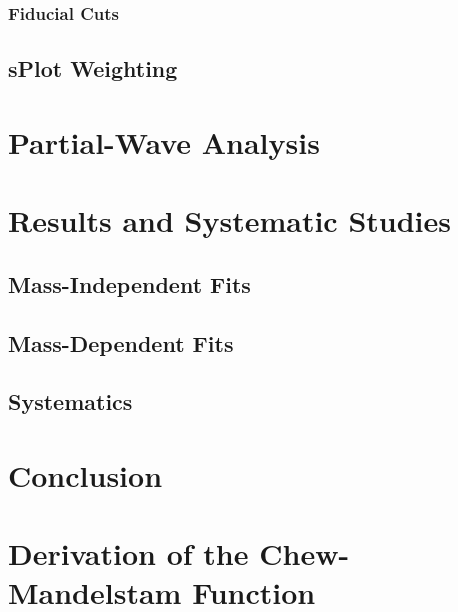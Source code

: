 \documentclass{memoir}
\begin{document}
\subsection{Fiducial Cuts}
\section{sPlot Weighting}

\chapter{Partial-Wave Analysis}

\chapter{Results and Systematic Studies}
\section{Mass-Independent Fits}
\section{Mass-Dependent Fits}
\section{Systematics}
\chapter{Conclusion}

\appendix
\chapter{Derivation of the Chew-Mandelstam Function}


\backmatter
\printbibliography
\newpage
\end{document}
